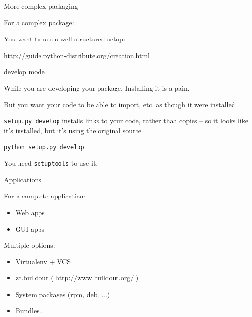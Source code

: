 \documentclass{beamer}
\begin{document}
\begin{frame}[fragile]{More complex packaging}

{\Large For a complex package:}

\vfill
{\Large You want to use a well structured setup:}

\vfill
\url{http://guide.python-distribute.org/creation.html}
\vfill
\end{frame} 

\begin{frame}[fragile]{develop mode}

{\Large While you are developing your package, Installing it is a pain.}

\vfill
{\Large But you want your code to be able to import, etc. as though it were installed}

\vfill
{\Large \verb|setup.py develop| installs links to your code, rather than copies
 -- so it looks like it's installed, but it's using the original source}

\vfill
{\Large \verb`python setup.py develop`}

\vfill
{\Large You need \verb|setuptools| to use it.}
\vfill
\end{frame} 

\begin{frame}[fragile]{Applications}

{\Large For a complete application:}
\begin{itemize}
  \item Web apps
  \item GUI apps
\end{itemize}

{\Large Multiple options:}
\begin{itemize}
  \item Virtualenv + VCS
  \item zc.buildout ( \url{http://www.buildout.org/} )
  \item System packages (rpm, deb, ...)
  \item Bundles...
\end{itemize}

\end{frame} 
\end{document}

